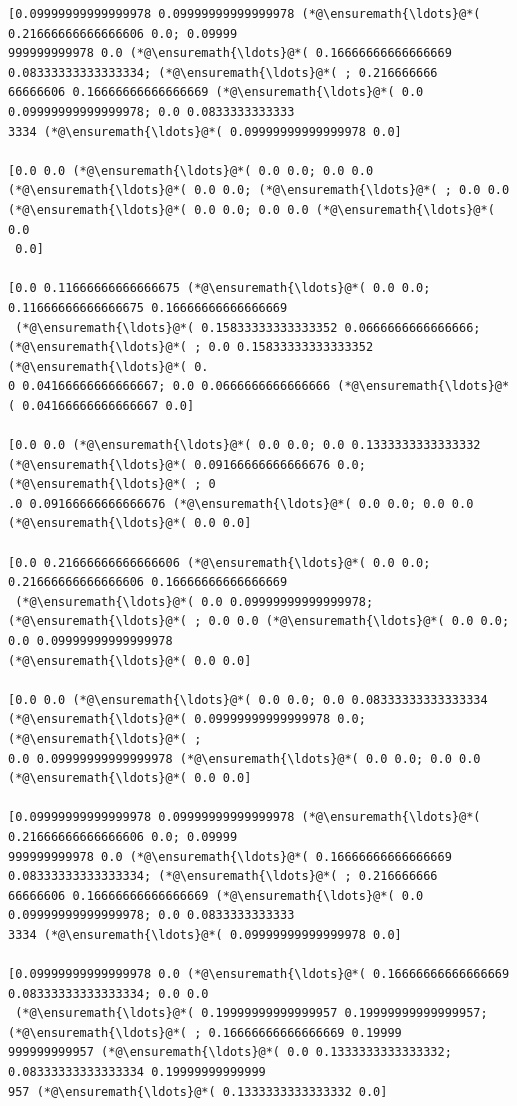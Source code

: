 \documentclass[12pt,a4paper]{article}
\begin{document}
\begin{lstlisting}
[0.09999999999999978 0.09999999999999978 (*@\ensuremath{\ldots}@*( 0.21666666666666606 0.0; 0.09999
999999999978 0.0 (*@\ensuremath{\ldots}@*( 0.16666666666666669 0.08333333333333334; (*@\ensuremath{\ldots}@*( ; 0.216666666
66666606 0.16666666666666669 (*@\ensuremath{\ldots}@*( 0.0 0.09999999999999978; 0.0 0.0833333333333
3334 (*@\ensuremath{\ldots}@*( 0.09999999999999978 0.0]

[0.0 0.0 (*@\ensuremath{\ldots}@*( 0.0 0.0; 0.0 0.0 (*@\ensuremath{\ldots}@*( 0.0 0.0; (*@\ensuremath{\ldots}@*( ; 0.0 0.0 (*@\ensuremath{\ldots}@*( 0.0 0.0; 0.0 0.0 (*@\ensuremath{\ldots}@*( 0.0
 0.0]

[0.0 0.11666666666666675 (*@\ensuremath{\ldots}@*( 0.0 0.0; 0.11666666666666675 0.16666666666666669
 (*@\ensuremath{\ldots}@*( 0.15833333333333352 0.0666666666666666; (*@\ensuremath{\ldots}@*( ; 0.0 0.15833333333333352 (*@\ensuremath{\ldots}@*( 0.
0 0.04166666666666667; 0.0 0.0666666666666666 (*@\ensuremath{\ldots}@*( 0.04166666666666667 0.0]

[0.0 0.0 (*@\ensuremath{\ldots}@*( 0.0 0.0; 0.0 0.1333333333333332 (*@\ensuremath{\ldots}@*( 0.09166666666666676 0.0; (*@\ensuremath{\ldots}@*( ; 0
.0 0.09166666666666676 (*@\ensuremath{\ldots}@*( 0.0 0.0; 0.0 0.0 (*@\ensuremath{\ldots}@*( 0.0 0.0]

[0.0 0.21666666666666606 (*@\ensuremath{\ldots}@*( 0.0 0.0; 0.21666666666666606 0.16666666666666669
 (*@\ensuremath{\ldots}@*( 0.0 0.09999999999999978; (*@\ensuremath{\ldots}@*( ; 0.0 0.0 (*@\ensuremath{\ldots}@*( 0.0 0.0; 0.0 0.09999999999999978 
(*@\ensuremath{\ldots}@*( 0.0 0.0]

[0.0 0.0 (*@\ensuremath{\ldots}@*( 0.0 0.0; 0.0 0.08333333333333334 (*@\ensuremath{\ldots}@*( 0.09999999999999978 0.0; (*@\ensuremath{\ldots}@*( ; 
0.0 0.09999999999999978 (*@\ensuremath{\ldots}@*( 0.0 0.0; 0.0 0.0 (*@\ensuremath{\ldots}@*( 0.0 0.0]

[0.09999999999999978 0.09999999999999978 (*@\ensuremath{\ldots}@*( 0.21666666666666606 0.0; 0.09999
999999999978 0.0 (*@\ensuremath{\ldots}@*( 0.16666666666666669 0.08333333333333334; (*@\ensuremath{\ldots}@*( ; 0.216666666
66666606 0.16666666666666669 (*@\ensuremath{\ldots}@*( 0.0 0.09999999999999978; 0.0 0.0833333333333
3334 (*@\ensuremath{\ldots}@*( 0.09999999999999978 0.0]

[0.09999999999999978 0.0 (*@\ensuremath{\ldots}@*( 0.16666666666666669 0.08333333333333334; 0.0 0.0
 (*@\ensuremath{\ldots}@*( 0.19999999999999957 0.19999999999999957; (*@\ensuremath{\ldots}@*( ; 0.16666666666666669 0.19999
999999999957 (*@\ensuremath{\ldots}@*( 0.0 0.1333333333333332; 0.08333333333333334 0.19999999999999
957 (*@\ensuremath{\ldots}@*( 0.1333333333333332 0.0]


\end{lstlisting}
\end{document}
